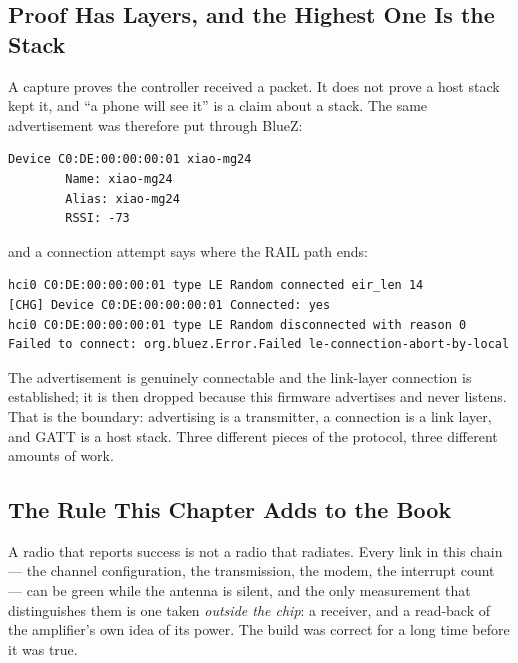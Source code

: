 \subsection{Proof Has Layers, and the Highest One Is the Stack}

A capture proves the controller received a packet. It does not prove a host stack kept it, and
``a phone will see it'' is a claim about a stack. The same advertisement was therefore put through BlueZ:

\begin{verbatim}
Device C0:DE:00:00:00:01 xiao-mg24
        Name: xiao-mg24
        Alias: xiao-mg24
        RSSI: -73
\end{verbatim}

and a connection attempt says where the RAIL path ends:

\begin{verbatim}
hci0 C0:DE:00:00:00:01 type LE Random connected eir_len 14
[CHG] Device C0:DE:00:00:00:01 Connected: yes
hci0 C0:DE:00:00:00:01 type LE Random disconnected with reason 0
Failed to connect: org.bluez.Error.Failed le-connection-abort-by-local
\end{verbatim}

The advertisement is genuinely connectable and the link-layer connection is established; it is then
dropped because this firmware advertises and never listens. That is the boundary: advertising is a
transmitter, a connection is a link layer, and GATT is a host stack. Three different pieces of the
protocol, three different amounts of work.

\subsection{The Rule This Chapter Adds to the Book}

A radio that reports success is not a radio that radiates. Every link in this chain --- the channel
configuration, the transmission, the modem, the interrupt count --- can be green while the antenna is
silent, and the only measurement that distinguishes them is one taken \emph{outside the chip}: a
receiver, and a read-back of the amplifier's own idea of its power. The build was correct for a long
time before it was true.
